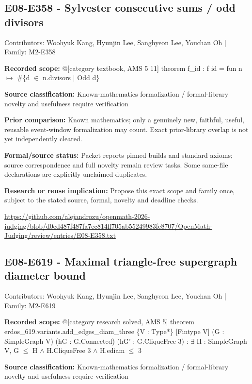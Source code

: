 \documentclass[11pt,a4paper]{article}
\begin{document}
\begin{samepage}
\subsection{E08-E358  -  Sylvester consecutive sums / odd divisors}
{\small Contributors: Woohyuk Kang, Hyunjin Lee, Sanghyeon Lee, Youchan Oh | Family: M2-E358\par}

\textbf{Recorded scope:} @[category textbook, AMS 5 11] theorem f\_id : f id = fun n \ensuremath{\mapsto} \#\{d \ensuremath{\in} n.divisors | Odd d\}


\end{samepage}
\textbf{Source classification:} Known-mathematics formalization / formal-library novelty and usefulness require verification

\textbf{Prior comparison:} Known mathematics; only a genuinely new, faithful, useful, reusable event-window formalization may count. Exact prior-library overlap is not yet independently cleared.

\textbf{Formal/source status:} Packet reports pinned builds and standard axioms; source correspondence and full novelty remain review tasks. Some same-file declarations are explicitly unclaimed duplicates.

\textbf{Research or reuse implication:} Propose this exact scope and family once, subject to the stated source, formal, novelty and deadline checks.

{\small \url{https://github.com/alejandrozu/openmath-2026-judging/blob/d0ed487f487fa7ec814ff705ab55249983fe8707/OpenMath-Judging/review/entries/E08-E358.txt}\par}

\begin{samepage}
\subsection{E08-E619  -  Maximal triangle-free supergraph diameter bound}
{\small Contributors: Woohyuk Kang, Hyunjin Lee, Sanghyeon Lee, Youchan Oh | Family: M2-E619\par}

\textbf{Recorded scope:} @[category research solved, AMS 5] theorem erdos\_619.variants.add\_edges\_diam\_three \{V : Type*\} [Fintype V] (G : SimpleGraph V) (hG : G.Connected) (hG' : G.CliqueFree 3) :
    \ensuremath{\exists} H : SimpleGraph V, G \ensuremath{\leq} H \ensuremath{\wedge} H.CliqueFree 3 \ensuremath{\wedge} H.ediam \ensuremath{\leq} 3


\end{samepage}
\textbf{Source classification:} Known-mathematics formalization / formal-library novelty and usefulness require verification
\end{document}
